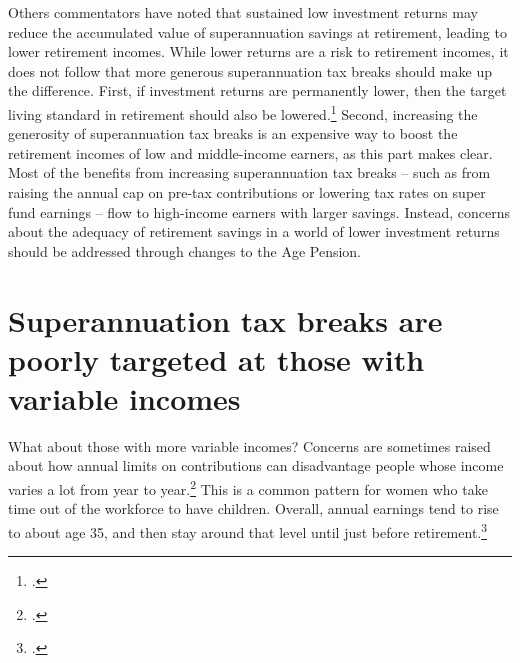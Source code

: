 Others commentators have noted that sustained low investment returns may reduce the accumulated value of superannuation savings at retirement, leading to lower retirement incomes.  While lower returns are a risk to retirement incomes, it does not follow that more generous superannuation tax breaks should make up the difference. First, if investment returns are permanently lower, then the target living standard in retirement should also be lowered.\footcites[][9]{ActuariesInstitute2015RetirementIncomes}{Blayney2015} Second, increasing the generosity of superannuation tax breaks is an expensive way to boost the retirement incomes of low and middle-income earners, as this part makes clear. Most of the benefits from increasing superannuation tax breaks – such as from raising the annual cap on pre-tax contributions or lowering tax rates on super fund earnings – flow to high-income earners with larger savings. Instead, concerns about the adequacy of retirement savings in a world of lower investment returns should be addressed through changes to the Age Pension.

\section{Superannuation tax breaks are poorly targeted at those with variable incomes\label{sec:SUPER-3-4}}
What about those with more variable incomes? Concerns are sometimes raised about how annual limits on contributions can disadvantage people whose income varies a lot from year to year.\footcite[][5]{ASFA2015b} This is a common pattern for women who take time out of the workforce to have children. Overall, annual earnings tend to rise to about age 35, and then stay around that level until just before retirement.\footcite[][18,19,49--50]{DaleyWoodWeidmannEtAl2014}  

